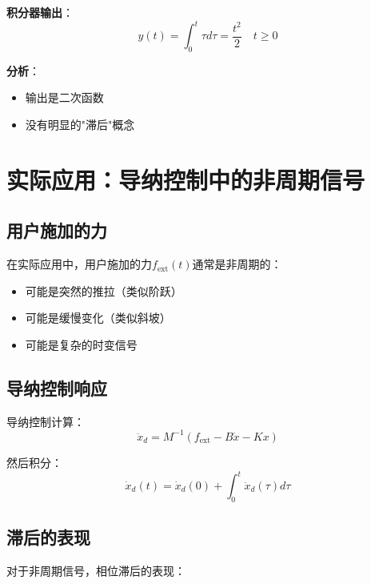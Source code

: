 \documentclass[12pt,a4paper]{article}
\begin{document}
\textbf{积分器输出}：
\begin{equation}
y(t) = \int_0^t \tau d\tau = \frac{t^2}{2} \quad t \geq 0
\end{equation}

\textbf{分析}：
\begin{itemize}
\item 输出是二次函数
\item 没有明显的"滞后"概念
\end{itemize}

\section{实际应用：导纳控制中的非周期信号}

\subsection{用户施加的力}

在实际应用中，用户施加的力$f_{\text{ext}}(t)$通常是非周期的：
\begin{itemize}
\item 可能是突然的推拉（类似阶跃）
\item 可能是缓慢变化（类似斜坡）
\item 可能是复杂的时变信号
\end{itemize}

\subsection{导纳控制响应}

导纳控制计算：
\begin{equation}
\ddot{x}_d = M^{-1}(f_{\text{ext}} - B\dot{x} - Kx)
\end{equation}

然后积分：
\begin{equation}
\dot{x}_d(t) = \dot{x}_d(0) + \int_0^t \ddot{x}_d(\tau) d\tau
\end{equation}

\subsection{滞后的表现}

对于非周期信号，相位滞后的表现：
\end{document}
